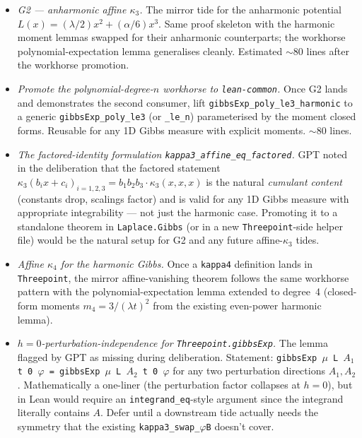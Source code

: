\documentclass[11pt]{article}
\begin{document}
\begin{itemize}[leftmargin=2em]
\item \emph{G2 — anharmonic affine $\kappa_3$.} The
mirror tide for the anharmonic potential
$L(x) = (\lambda/2)x^2 + (\alpha/6)x^3$. Same proof skeleton with
the harmonic moment lemmas swapped for their anharmonic
counterparts; the workhorse polynomial-expectation lemma generalises
cleanly. Estimated $\sim$80 lines after the workhorse promotion.

\item \emph{Promote the polynomial-degree-$n$ workhorse to
\texttt{lean-common}.} Once G2 lands and demonstrates the second
consumer, lift \texttt{gibbsExp\_poly\_le3\_harmonic} to a generic
\texttt{gibbsExp\_poly\_le3} (or \texttt{\_le\_n}) parameterised by
the moment closed forms. Reusable for any 1D Gibbs measure with
explicit moments. $\sim$80 lines.

\item \emph{The factored-identity formulation
\texttt{kappa3\_affine\_eq\_factored}.} GPT noted in the
deliberation that the factored statement
$\kappa_3(b_i x + c_i)_{i=1,2,3}
= b_1 b_2 b_3 \cdot \kappa_3(x, x, x)$
is the natural \emph{cumulant content} (constants drop, scalings
factor) and is valid for any 1D Gibbs measure with appropriate
integrability — not just the harmonic case. Promoting it to a
standalone theorem in \texttt{Laplace.Gibbs} (or in a new
\texttt{Threepoint}-side helper file) would be the natural setup for
G2 and any future affine-$\kappa_3$ tides.

\item \emph{Affine $\kappa_4$ for the harmonic Gibbs.} Once a
\texttt{kappa4} definition lands in \texttt{Threepoint}, the
mirror affine-vanishing theorem follows the same workhorse pattern
with the polynomial-expectation lemma extended to degree~4
(closed-form moments $m_4 = 3/(\lambda t)^2$ from the existing
even-power harmonic lemma).

\item \emph{$h=0$-perturbation-independence for
\texttt{Threepoint.gibbsExp}.} The lemma flagged by GPT as missing
during deliberation. Statement: \texttt{gibbsExp $\mu$ L $A_1$ t 0
$\varphi$ = gibbsExp $\mu$ L $A_2$ t 0 $\varphi$} for any two
perturbation directions $A_1, A_2$. Mathematically a one-liner
(the perturbation factor collapses at $h=0$), but in Lean would
require an \texttt{integrand\_eq}-style argument since the integrand
literally contains $A$. Defer until a downstream tide actually
needs the symmetry that the existing \texttt{kappa3\_swap\_$\varphi$B}
doesn't cover.
\end{itemize}
\end{document}

